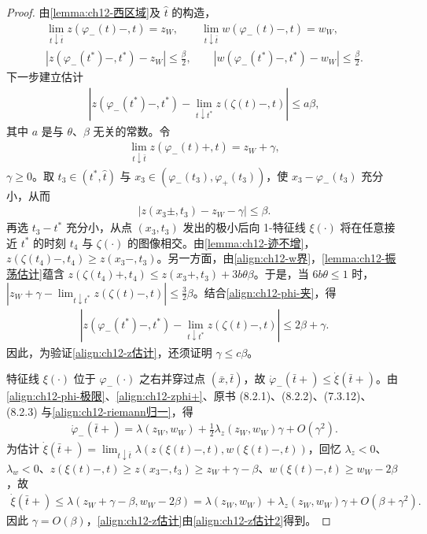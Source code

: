 \documentclass[../../main.tex]{subfiles}
\begin{document}
\begin{proof}
由\cref{lemma:ch12-西区域}及 $\hat t$ 的构造，
\begin{align}
\lim_{t\downarrow\bar t}z(\varphi_-(t)-,t)=z_W,\qquad \lim_{t\downarrow\bar t}w(\varphi_-(t)-,t)=w_W,
\label{align:ch12-phi-极限}\\
|z(\varphi_-(t^*)-,t^*)-z_W|\leqslant\frac{\beta}{2},\qquad |w(\varphi_-(t^*)-,t^*)-w_W|\leqslant\frac{\beta}{2}.
\label{align:ch12-phi-夹}
\end{align}
下一步建立估计
\begin{align}
|z(\varphi_-(t^*)-,t^*)-\lim_{t\downarrow t^*}z(\zeta(t)-,t)|\leqslant a\beta,
\label{align:ch12-z估计}
\end{align}
其中 $a$ 是与 $\theta$、$\beta$ 无关的常数。令
\begin{align}
\lim_{t\downarrow\bar t}z(\varphi_-(t)+,t)=z_W+\gamma,
\label{align:ch12-zphi+}
\end{align}
$\gamma\geqslant0$。取 $t_3\in(t^*,\hat t)$ 与 $x_3\in(\varphi_-(t_3),\varphi_+(t_3))$，使 $x_3-\varphi_-(t_3)$ 充分小，从而
\begin{align}
|z(x_3\pm,t_3)-z_W-\gamma|\leqslant\beta.
\label{align:ch12-x3}
\end{align}
再选 $t_3-t^*$ 充分小，从点 $(x_3,t_3)$ 发出的极小后向 1-特征线 $\xi(\cdot)$ 将在任意接近 $t^*$ 的时刻 $t_4$ 与 $\zeta(\cdot)$ 的图像相交。由\cref{lemma:ch12-迹不增}，$z(\zeta(t_4)-,t_4)\geqslant z(x_3-,t_3)$。另一方面，由\eqref{align:ch12-w界}，\cref{lemma:ch12-振荡估计}蕴含 $z(\zeta(t_4)+,t_4)\leqslant z(x_3+,t_3)+3b\theta\beta$。于是，当 $6b\theta\leqslant1$ 时，$|z_W+\gamma-\lim_{t\downarrow t^*}z(\zeta(t)-,t)|\leqslant\frac32\beta$。结合\eqref{align:ch12-phi-夹}，得
\begin{align}
|z(\varphi_-(t^*)-,t^*)-\lim_{t\downarrow t^*}z(\zeta(t)-,t)|\leqslant 2\beta+\gamma.
\label{align:ch12-z估计2}
\end{align}
因此，为验证\eqref{align:ch12-z估计}，还须证明 $\gamma\leqslant c\beta$。

特征线 $\xi(\cdot)$ 位于 $\varphi_-(\cdot)$ 之右并穿过点 $(\bar x,\bar t)$，故 $\dot\varphi_-(\bar t+)\leqslant\dot\xi(\bar t+)$。由\eqref{align:ch12-phi-极限}、\eqref{align:ch12-zphi+}、原书 (8.2.1)、(8.2.2)、(7.3.12)、(8.2.3) 与\eqref{align:ch12-riemann归一}，得
\begin{align}
\dot\varphi_-(\bar t+)=\lambda(z_W,w_W)+\frac12\lambda_z(z_W,w_W)\gamma+O(\gamma^2).
\label{align:ch12-phidot}
\end{align}
为估计 $\dot\xi(\bar t+)=\lim_{t\downarrow\bar t}\lambda(z(\xi(t)-,t),w(\xi(t)-,t))$，回忆 $\lambda_z<0$、$\lambda_w<0$、$z(\xi(t)-,t)\geqslant z(x_3-,t_3)\geqslant z_W+\gamma-\beta$、$w(\xi(t)-,t)\geqslant w_W-2\beta$，故
\begin{align}
\dot\xi(\bar t+)\leqslant\lambda(z_W+\gamma-\beta,w_W-2\beta)=\lambda(z_W,w_W)+\lambda_z(z_W,w_W)\gamma+O(\beta+\gamma^2).
\label{align:ch12-xidot}
\end{align}
因此 $\gamma=O(\beta)$，\eqref{align:ch12-z估计}由\eqref{align:ch12-z估计2}得到。


\end{proof}
\end{document}
